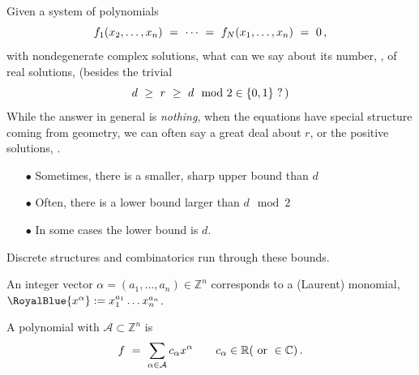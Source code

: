 \documentclass[17pt,landscape]{Narrow}
\newcommand{\DeCo}{\RoyalBlue}
\newcommand{\C}{{\mathbb C}}
\newcommand{\R}{{\mathbb R}}
\newcommand{\Z}{{\mathbb Z}}
\newcommand{\calA}{{\mathcal A}}
\begin{document}
\setcounter{page}{0}
\begin{flushleft}
\slide{}
\LogoOn
\begin{center}
\end{center}

Given a system of polynomials\vspace{-8pt}
\[
   f_1(x_2,\dotsc,x_n)\ =\  \dotsb\ =\ f_N(x_1,\dotsc,x_n)\ =\ 0\,,\vspace{-8pt}
\]
with \DeCo{$d$} nondegenerate complex solutions, what can we say about its number, 
\DeCo{$r$}, of real solutions, (besides the trivial\vspace{-8pt}
\[
    d\ \geq\ r\ \geq\ d\mod 2 \in\{0,1\}\ ?\,)\vspace{-8pt}
\]
While the answer in general is {\sl nothing}, when the equations have special structure
coming from geometry, we can often say a great deal about $r$,
or the positive solutions, \DeCo{$r_+$}.\vspace{-8pt}

\begin{itemize}
 \item[$\bullet$] Sometimes, there is a smaller, sharp upper bound than $d$
 \item[$\bullet$] Often, there is a lower bound larger than $d\mod 2$
 \item[$\bullet$] In some cases the lower bound is $d$.\vspace{-8pt}
\end{itemize}

Discrete structures and combinatorics run through these bounds.

\slide{}
\LogoOn
\begin{center}
\end{center}

\noindent
An integer vector $\alpha=(a_1,\dotsc,a_n)\in\Z^n$ \newline
corresponds to a (Laurent) monomial, $\DeCo{x^\alpha}:= x_1^{a_1} \dotsc x_n^{a_n}$.

A polynomial with \DeCo{support} $\calA\subset\Z^n$ is\vspace{-8pt}
\[
   f\ =\ \sum_{\alpha\in \calA} c_\alpha x^\alpha
   \qquad c_\alpha\in\R (\ \mbox{or}\ \in\C)\,.\vspace{-8pt}
\]


\end{flushleft}
\end{document}
